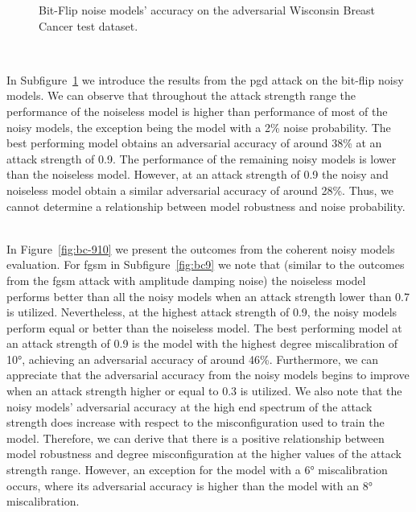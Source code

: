 \begin{figure}[!h]
\begin{subfigure}{0.45\textwidth}
      \label{fig:bc8}
  \end{subfigure}
  \caption{Bit-Flip noise models' accuracy on the adversarial Wisconsin Breast Cancer test dataset.}
  \label{fig:bc-78}
\end{figure} \

In Subfigure~\ref{fig:bc8} we introduce the results from the \ac{pgd}
attack on the bit-flip noisy models. We can observe that throughout
the attack strength range the performance of the noiseless model is
higher than performance of most of the noisy models, the exception
being the model with a 2\% noise probability. The best performing
model obtains an adversarial accuracy of around 38\% at an attack
strength of 0.9. The performance of the remaining noisy models is lower
than the noiseless model. However, at an attack strength of 0.9 the noisy
and noiseless model obtain a similar adversarial accuracy of around
28\%. Thus, we cannot determine a relationship between model robustness
and noise probability. \

In Figure~\ref{fig:bc-910} we present the outcomes from the coherent
noisy models evaluation. For \ac{fgsm} in Subfigure~\ref{fig:bc9}
we note that (similar to the outcomes from the \ac{fgsm} attack
with amplitude damping noise) the noiseless model performs better than all the
noisy models when an attack strength lower than 0.7 is utilized.
Nevertheless, at the highest attack strength of 0.9, the noisy
models perform equal or better than the noiseless model. The
best performing model at an attack strength of 0.9 is the model
with the highest degree miscalibration of 10°, achieving an adversarial
accuracy of around 46\%. Furthermore, we can appreciate that the adversarial
accuracy from the noisy models begins to improve when an attack strength
higher or equal to 0.3 is utilized. We also note that the noisy models'
adversarial accuracy at the high end spectrum of the attack
strength does increase with respect to the misconfiguration
used to train the model. Therefore, we can derive that there
is a positive relationship between model robustness and degree
misconfiguration at the higher values of the attack strength
range. However, an exception for the model with a 6° miscalibration
occurs, where its adversarial accuracy is higher than the model
with an 8° miscalibration. \

